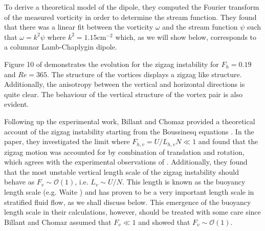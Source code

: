 To derive a theoretical model of the dipole, they computed the Fourier transform of the measured vorticity in order to determine the stream function. They found that there was a linear fit between the vorticity $\omega$ and the stream function $\psi$ such that $\omega = k^{2}\psi$ where $k^{2}=1.15 \text{cm}^{-2}$  which, as we will show below, corresponds to a columnar Lamb-Chaplygin dipole.

Figure 10 of \cite{bc2000a} demonstrates the evolution for the zigzag instability for $F_{h}=0.19$ and $Re=365$. The structure of the vortices displays a zigzag like structure. Additionally, the anisotropy between the vertical and horizontal directions is quite clear. The behaviour of the vertical structure of the vortex pair is also evident. 



Following up the experimental work, Billant and Chomaz provided a theoretical account of the zigzag instability starting from the Boussinesq equations \cite{bc2000b}.  In the paper, they investigated the limit where $F_{h,v} = U/L_{h,v}N \ll 1$ and found that the zigzag motion was accounted for by combination of translation and rotation, which agrees with the experimental observations of \cite{bc2000a}. Additionally, they found that the most unstable vertical length scale of the zigzag instability should behave as $F_{v} \sim \mathcal{O}(1)$, i.e. $L_{v} \sim U/N$. This length is known as the buoyancy length scale (e.g. Waite \cite{waite2011}) and has proven to be a very important length scale in stratified fluid flow, as we shall discuss below. This emergence of the buoyancy length scale in their calculations, however,  should be treated with some care since Billant and Chomaz assumed that $F_{v}\ll 1$ and showed that $F_{v}\sim \mathcal{O}(1)$. 

